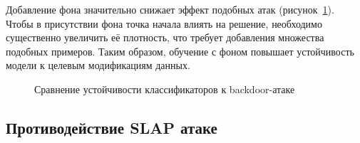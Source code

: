 Добавление фона значительно снижает эффект подобных атак (рисунок~\cref{fig:backdor_attack}). Чтобы в присутствии фона точка начала влиять на решение, необходимо существенно увеличить её плотность, что требует добавления множества подобных примеров. Таким образом, обучение с фоном повышает устойчивость модели к целевым модификациям данных.

\begin{figure}[ht]
    \caption{Сравнение устойчивости классификаторов к backdoor-атаке}
    \label{fig:backdor_attack}
\end{figure}

\subsection{Противодействие SLAP атаке}

